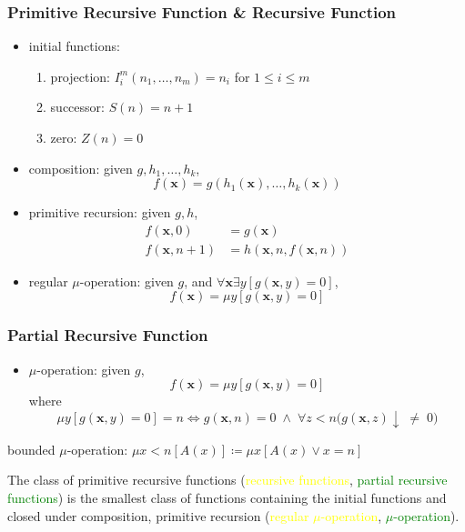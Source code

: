 \documentclass[UTF8,11pt,colorlinks,compress,openany]{beamer}%
\begin{document}
\begin{frame}\frametitle{Primitive Recursive Function \& Recursive Function}
	\begin{itemize}
		\item initial functions:
		\begin{enumerate}
			\item projection: $I_i^m(n_1,\dots,n_m)=n_i$ for $1\leq i\leq m$
			\item successor: $S(n)=n+1$
			\item zero: $Z(n)=0$
		\end{enumerate}
		\item composition: given $g,h_1,\dots,h_k$,
		\[f(\mathbf{x})=g\left(h_1(\mathbf{x}),\dots,h_k(\mathbf{x})\right)\]
		\item primitive recursion: given $g,h$,
		\begin{align*}
		f(\mathbf{x},0)&=g(\mathbf{x})\\
		f(\mathbf{x},n+1)&=h\left(\mathbf{x},n,f(\mathbf{x},n)\right)
		\end{align*}
		\item regular $\mu$-operation: given $g$, and $\forall \mathbf{x}\exists y[g(\mathbf{x},y)=0]$,
		\[f(\mathbf{x})=\mu y[g(\mathbf{x},y)=0]\]
	\end{itemize}
\end{frame}

\begin{frame}\frametitle{Partial Recursive Function}
	\begin{itemize}
		\item $\mu$-operation: given $g$,
		\[f(\mathbf{x})=\mu y\left[g(\mathbf{x},y)=0\right]\]
		where
		\[\mu y\left[g(\mathbf{x},y)=0\right]=n\iff g(\mathbf{x},n)=0\;\wedge\;\forall z<n\big(g(\mathbf{x},z)\!\downarrow\;\ne\;0\big)\]
	\end{itemize}
	bounded $\mu$-operation: $\mu x<n[A(x)]\coloneqq \mu x[A(x)\vee x=n]$
	\begin{definition}
		The class of primitive recursive functions (\textcolor{yellow}{recursive functions}, \textcolor{green}{partial recursive functions}) is the smallest class of functions containing the initial functions and closed under composition, primitive recursion (\textcolor{yellow}{regular $\mu$-operation}, \textcolor{green}{$\mu$-operation}).
	\end{definition}
\end{frame}
\end{document}
